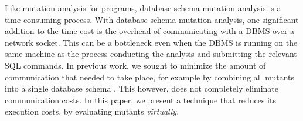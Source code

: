 Like mutation analysis for programs, database schema mutation analysis is a time-consuming process. With database schema mutation analysis, one significant addition to the time cost is the overhead of communicating with a DBMS over a network socket. This can be a bottleneck even when the DBMS is running on the same machine as the process conducting the analysis and submitting the relevant SQL commands. In previous work, we sought to minimize the amount of communication that needed to take place, for example by combining all mutants into a single database schema \cite{Wright2013}. This however, does not completely eliminate communication costs. In this paper, we present a technique that reduces its execution costs, by evaluating mutants {\it virtually}. 



